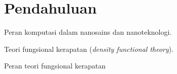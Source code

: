 \section{Pendahuluan}

Peran komputasi dalam nanosains dan nanoteknologi.

Teori fungsional kerapatan (\emph{density functional theory}).

Peran teori fungsional kerapatan
